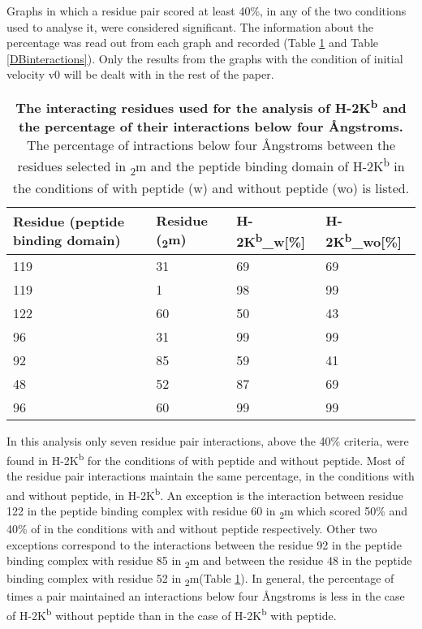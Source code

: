 \documentclass[11pt,twocolumn]{article}
\newcommand{\kb}{H-2K\textsuperscript{b}\xspace}
\newcommand{\kbw}{H-2K\textsuperscript{b}\_w\xspace}
\newcommand{\kbwo}{H-2K\textsuperscript{b}\_wo\xspace}
\newcommand{\angstr}{{\AA}ngstroms\xspace}
\newcommand{\btm}{\textbeta\textsubscript{2}m\xspace}
\begin{document}
Graphs in which a residue pair scored at least 40\%, in any of the two conditions used to analyse it,  were considered significant. The information about the percentage was read out from each graph and recorded (Table \ref{KBinteractions} and Table \ref{DBinteractions}). Only the results from the graphs with the condition of initial velocity v0 will be dealt with in the rest of the paper.


\begin{table}[H]
\caption{\textbf{The interacting residues used for the analysis of \kb and the percentage of their interactions below four \angstr. } The percentage of intractions below four \angstr between the residues selected in \btm and the peptide binding domain of \kb in the conditions of with peptide (w) and without peptide (wo) is listed.}
\label{KBinteractions}
\begin{tabularx}{\linewidth}{|X|X|X|X|}  \hline
Residue (peptide binding domain) &Residue (\btm)&\kbw [\%]&\kbwo [\%]\\ \hline
119&31&69&69\\ \hline
119&1&98&99\\ \hline
122&60&50&43\\ \hline
96&31&99&99\\ \hline
92&85&59&41\\ \hline
48&52&87&69\\ \hline
96&60&99&99\\ \hline
\end{tabularx}
\end{table}

In this analysis only seven residue pair interactions, above the 40\% criteria, were found in \kb for the conditions of with peptide  and without peptide. Most of the residue pair interactions maintain the same percentage, in  the conditions with and without peptide, in  \kb. An exception is the interaction between  residue 122 in the peptide binding complex with residue 60 in \btm which scored 50\% and 40\% of in the conditions with and without peptide respectively. Other two exceptions correspond to the interactions between the residue 92  in the peptide binding complex with residue 85 in \btm and between the residue 48 in the peptide binding complex with residue 52 in \btm (Table \ref{KBinteractions}). In general, the percentage of times a pair maintained an interactions below four \angstr is less in the case of \kb without peptide than in the case of \kb with peptide.  
\end{document}

